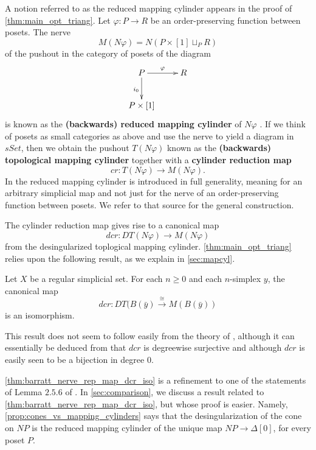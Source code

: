 A notion referred to as the reduced mapping cylinder \cite[§2.4]{WJR13} appears in the proof of \cref{thm:main_opt_triang}. Let $\varphi :P\to R$ be an order-preserving function between posets. The nerve
\[M(N\varphi )=N(P\times [1]\sqcup _PR)\]
of the pushout in the category of posets of the diagram
\begin{equation}
\begin{gathered}
\xymatrix{
P \ar[d]_{i_0} \ar[r]^\varphi & R \\
P\times [1]
}
\end{gathered}
\end{equation}
is known as the \textbf{(backwards) reduced mapping cylinder} of $N\varphi$ \cite[Def.~2.4.4]{WJR13}. If we think of posets as small categories as above and use the nerve to yield a diagram in $sSet$, then we obtain the pushout $T(N\varphi )$ known as the \textbf{(backwards) topological mapping cylinder} together with a \textbf{cylinder reduction map} \cite[Def.~2.4.5]{WJR13}
\[cr:T(N\varphi )\to M(N\varphi ).\]
In \cite[§2.4]{WJR13} the reduced mapping cylinder is introduced in full generality, meaning for an arbitrary simplicial map and not just for the nerve of an order-preserving function between posets. We refer to that source for the general construction.

The cylinder reduction map gives rise to a canonical map
\[dcr:DT(N\varphi )\to M(N\varphi )\]
from the desingularized toplogical mapping cylinder. \cref{thm:main_opt_triang} relies upon the following result, as we explain in \cref{sec:mapcyl}.
\begin{theorem}\label{thm:barratt_nerve_rep_map_dcr_iso}
Let $X$ be a regular simplicial set. For each $n\geq 0$ and each $n$-simplex $y$, the canonical map
\[dcr:DT(B(\bar{y} )\xrightarrow{\cong } M(B(\bar{y} ))\]
is an isomorphism.
\end{theorem}
\noindent This result does not seem to follow easily from the theory of \cite[§§2.4--2.5]{WJR13}, although it can essentially be deduced from \cite[Cor.~2.5.7]{WJR13} that $dcr$ is degreewise surjective and although $dcr$ is easily seen to be a bijection in degree $0$.

\cref{thm:barratt_nerve_rep_map_dcr_iso} is a refinement to one of the statements of Lemma $2.5.6$ of \cite[p.~71]{WJR13}. In \cref{sec:comparison}, we discuss a result related to \cref{thm:barratt_nerve_rep_map_dcr_iso}, but whose proof is easier. Namely, \cref{prop:cones_vs_mapping_cylinders} says that the desingularization of the cone on $NP$ is the reduced mapping cylinder of the unique map $NP\to \Delta [0]$, for every poset $P$.

